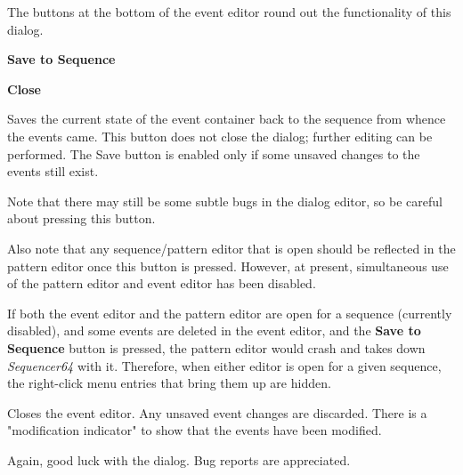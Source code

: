    The buttons at the bottom of the event editor round out the functionality of
   this dialog.

   \begin{enumber}
      \item \textbf{Save to Sequence}
      \item \textbf{Close}
   \end{enumber}

   \setcounter{ItemCounter}{0}      %

   Saves the current state of the event container back to the sequence from
   whence the events came.  This button does not close the dialog; further
   editing can be performed.  The Save button is enabled only if
   some unsaved changes to the events still exist.

   Note that there may still be some subtle bugs in the dialog editor, so be
   careful about pressing this button.

   Also note that any sequence/pattern editor that is open should be reflected
   in the pattern editor once this button is pressed.  However, at present,
   simultaneous use of the pattern editor and event editor has been disabled.

   If both the event editor and the pattern editor are open for a sequence
   (currently disabled), and
   some events are deleted in the event editor, and the
   \textbf{Save to Sequence} button is pressed, the pattern editor would
   crash and
   takes down \textsl{Sequencer64} with it.  Therefore, when either editor is
   open for a given sequence, the right-click menu entries that bring them up
   are hidden.

   Closes the event editor.
   Any unsaved event changes are discarded.
   There is a "modification indicator" to show that the events have
   been modified.

   Again, good luck with the dialog.  Bug reports are appreciated.

